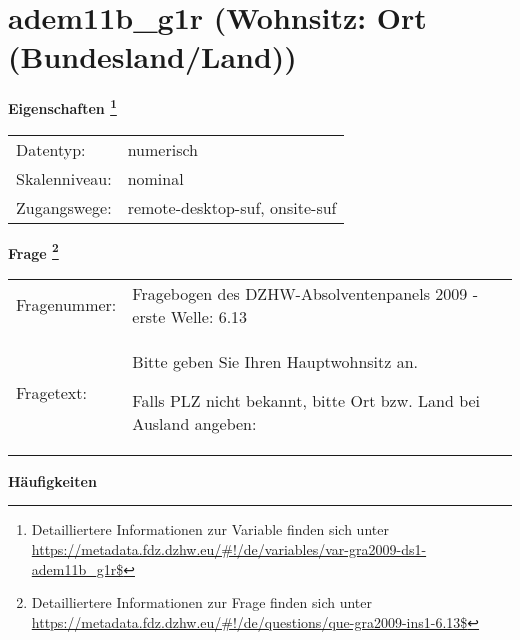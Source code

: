 
    \setcounter{footnote}{0}

    \vspace*{-1.8cm}
	\section{adem11b\_g1r (Wohnsitz: Ort (Bundesland/Land))}
	\label{section:adem11b_g1r}



    \vspace*{0.5cm}
    \noindent\textbf{Eigenschaften
	\footnote{Detailliertere Informationen zur Variable finden sich unter
		\url{https://metadata.fdz.dzhw.eu/\#!/de/variables/var-gra2009-ds1-adem11b_g1r$}}}\\
	\begin{tabularx}{\hsize}{@{}lX}
	Datentyp: & numerisch \\
	Skalenniveau: & nominal \\
	Zugangswege: &
	  remote-desktop-suf, 
	  onsite-suf
 \\
    \end{tabularx}



				\vspace*{0.5cm}
                \noindent\textbf{Frage
	                \footnote{Detailliertere Informationen zur Frage finden sich unter
		              \url{https://metadata.fdz.dzhw.eu/\#!/de/questions/que-gra2009-ins1-6.13$}}}\\
				\begin{tabularx}{\hsize}{@{}lX}
					Fragenummer: &
					  Fragebogen des DZHW-Absolventenpanels 2009 - erste Welle:
					  6.13
 \\
					Fragetext: & Bitte geben Sie Ihren Hauptwohnsitz an.\par  Falls PLZ nicht bekannt, bitte Ort bzw. Land bei Ausland angeben: \\
				\end{tabularx}





        		\vspace*{0.5cm}
                \noindent\textbf{Häufigkeiten}

